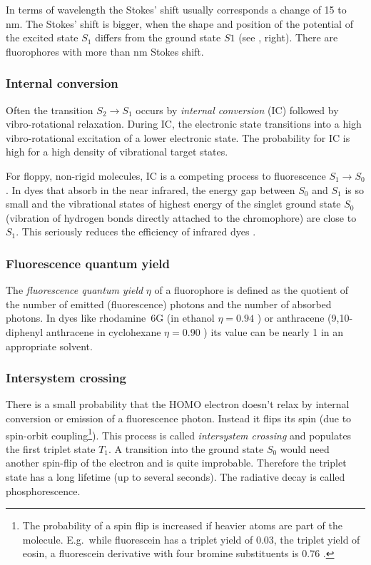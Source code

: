 In terms of wavelength the Stokes' shift usually corresponds a change
of 15 to \unit[30]{nm}. The Stokes' shift is bigger, when the shape and
position of the potential of the excited state $S_1$ differs from the
ground state $S1$ (see , right). There are
fluorophores with more than \unit[100]{nm} Stokes shift.

\subsubsection{Internal conversion}
Often the transition $S_2\rightarrow S_1$ occurs by \emph{internal
  conversion} (IC) followed by vibro-rotational relaxation. During IC,
the electronic state transitions into a high vibro-rotational
excitation of a lower electronic state. The probability for IC is high
for a high density of vibrational target states.

For floppy, non-rigid molecules, IC is a competing process to
fluorescence $S_1\rightarrow S_0$. In dyes that absorb in the near
infrared, the energy gap between $S_0$ and $S_1$ is so small and the
vibrational states of highest energy of the singlet ground state $S_0$
(vibration of hydrogen bonds directly attached to the chromophore) are
close to $S_1$. This seriously reduces the efficiency of infrared dyes
\citep[p.~43]{Sauer2011}.


\subsubsection{Fluorescence quantum yield}
The \emph{fluorescence quantum yield} $\eta$ of a fluorophore is
defined as the quotient of the number of emitted (fluorescence)
photons and the number of absorbed photons. In dyes like rhodamine~6G
(in ethanol $\eta=0.94$ \cite{Fischer1996}) or anthracene
(9,10-diphenyl anthracene in cyclohexane $\eta=0.90$ \cite{Hamai1983})
its value can be nearly 1 in an appropriate solvent.


\subsubsection{Intersystem crossing}
There is a small probability that the HOMO electron doesn't relax by
internal conversion or emission of a fluorescence photon. Instead it
flips its spin (due to spin-orbit coupling\footnote{The probability of
  a spin flip is increased if heavier atoms are part of the
  molecule. E.g.\ while fluorescein has a triplet yield of 0.03, the
  triplet yield of eosin, a fluorescein derivative with four bromine
  substituents is 0.76 \citep[p.~37]{Sauer2011}.}). This process is
called \emph{intersystem crossing} and populates the first triplet
state $T_1$. A transition into the ground state $S_0$ would need
another spin-flip of the electron and is quite improbable. Therefore
the triplet state has a long lifetime (up to several seconds). The
radiative decay is called phosphorescence.
  

